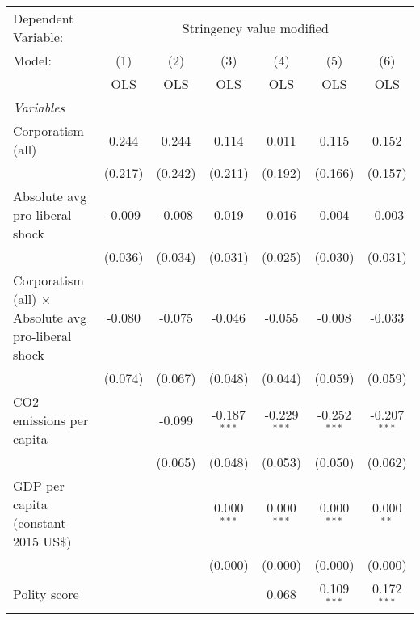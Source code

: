 
\begingroup
\centering
\begin{tabular}{lcccccc}
   \toprule
   Dependent Variable: & \multicolumn{6}{c}{Stringency value modified}\\
   Model:                                                     & (1)     & (2)     & (3)            & (4)            & (5)            & (6)\\  
                                                              &  OLS    & OLS     & OLS            & OLS            & OLS            & OLS\\  
   \midrule
   \emph{Variables}\\
   Corporatism (all)                                          & 0.244   & 0.244   & 0.114          & 0.011          & 0.115          & 0.152\\   
                                                              & (0.217) & (0.242) & (0.211)        & (0.192)        & (0.166)        & (0.157)\\   
   Absolute avg pro-liberal shock                             & -0.009  & -0.008  & 0.019          & 0.016          & 0.004          & -0.003\\   
                                                              & (0.036) & (0.034) & (0.031)        & (0.025)        & (0.030)        & (0.031)\\   
   Corporatism (all) $\times$ Absolute avg pro-liberal shock  & -0.080  & -0.075  & -0.046         & -0.055         & -0.008         & -0.033\\   
                                                              & (0.074) & (0.067) & (0.048)        & (0.044)        & (0.059)        & (0.059)\\   
   CO2 emissions per capita                                   &         & -0.099  & -0.187$^{***}$ & -0.229$^{***}$ & -0.252$^{***}$ & -0.207$^{***}$\\   
                                                              &         & (0.065) & (0.048)        & (0.053)        & (0.050)        & (0.062)\\   
   GDP per capita (constant 2015 US\$)                        &         &         & 0.000$^{***}$  & 0.000$^{***}$  & 0.000$^{***}$  & 0.000$^{**}$\\   
                                                              &         &         & (0.000)        & (0.000)        & (0.000)        & (0.000)\\   
   Polity score                                               &         &         &                & 0.068          & 0.109$^{***}$  & 0.172$^{***}$\\   

\end{tabular}
